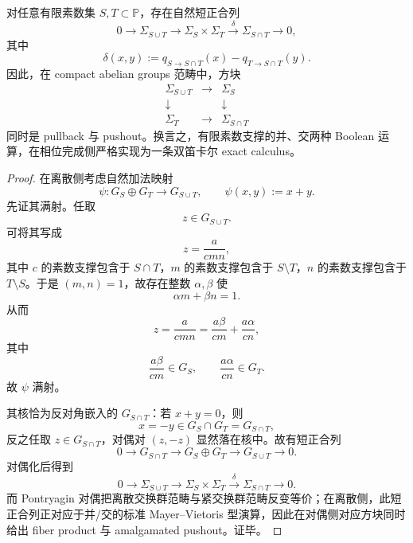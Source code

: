 \begin{theorem}\label{thm:conclusion-finite-primesupport-bicartesian-boolean-calculus}
对任意有限素数集 \(S,T\subset \mathbb P\)，存在自然短正合列
\[
0\longrightarrow \Sigma_{S\cup T}
\longrightarrow \Sigma_S\times \Sigma_T
\xrightarrow{\ \delta\ }
\Sigma_{S\cap T}
\longrightarrow 0,
\]
其中
\[
\delta(x,y):=q_{S\to S\cap T}(x)-q_{T\to S\cap T}(y).
\]
因此，在 compact abelian groups 范畴中，方块
\[
\begin{matrix}
\Sigma_{S\cup T} &\longrightarrow& \Sigma_S\\
\downarrow && \downarrow\\
\Sigma_T &\longrightarrow& \Sigma_{S\cap T}
\end{matrix}
\]
同时是 pullback 与 pushout。换言之，有限素数支撑的并、交两种 Boolean 运算，在相位完成侧严格实现为一条双笛卡尔 exact calculus。
\end{theorem}
\begin{proof}
在离散侧考虑自然加法映射
\[
\psi:G_S\oplus G_T\longrightarrow G_{S\cup T},
\qquad
\psi(x,y):=x+y.
\]
先证其满射。任取
\[
z\in G_{S\cup T}.
\]
可将其写成
\[
z=\frac{a}{cmn},
\]
其中 \(c\) 的素数支撑包含于 \(S\cap T\)，\(m\) 的素数支撑包含于 \(S\setminus T\)，\(n\) 的素数支撑包含于 \(T\setminus S\)。于是 \((m,n)=1\)，故存在整数 \(\alpha,\beta\) 使
\[
\alpha m+\beta n=1.
\]
从而
\[
z=\frac{a}{cmn}
=
\frac{a\beta}{cm}+\frac{a\alpha}{cn},
\]
其中
\[
\frac{a\beta}{cm}\in G_S,
\qquad
\frac{a\alpha}{cn}\in G_T.
\]
故 \(\psi\) 满射。

其核恰为反对角嵌入的 \(G_{S\cap T}\)：若 \(x+y=0\)，则
\[
x=-y\in G_S\cap G_T=G_{S\cap T},
\]
反之任取 \(z\in G_{S\cap T}\)，对偶对 \((z,-z)\) 显然落在核中。故有短正合列
\[
0\longrightarrow G_{S\cap T}
\longrightarrow G_S\oplus G_T
\longrightarrow G_{S\cup T}
\longrightarrow 0.
\]
对偶化后得到
\[
0\longrightarrow \Sigma_{S\cup T}
\longrightarrow \Sigma_S\times \Sigma_T
\xrightarrow{\ \delta\ }
\Sigma_{S\cap T}
\longrightarrow 0.
\]
而 Pontryagin 对偶把离散交换群范畴与紧交换群范畴反变等价；在离散侧，此短正合列正对应于并/交的标准 Mayer--Vietoris 型演算，因此在对偶侧对应方块同时给出 fiber product 与 amalgamated pushout。证毕。
\end{proof}

